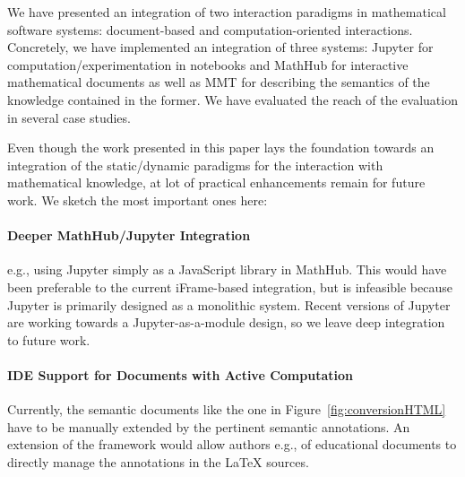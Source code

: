
We have presented an integration of two interaction paradigms in mathematical software systems: document-based and computation-oriented interactions. Concretely, we have implemented an integration of three systems:
Jupyter for computation/experimentation in notebooks and MathHub for interactive mathematical documents as well as MMT for describing the semantics of the knowledge contained in the former.
We have evaluated the reach of the evaluation in several case studies.


Even though the work presented in this paper lays the  foundation towards an integration of the static/dynamic paradigms for the interaction with mathematical knowledge, at lot of practical enhancements remain for future work.
We sketch the most important ones here:

\paragraph{Deeper MathHub/Jupyter Integration} e.g., using Jupyter simply as a JavaScript library in MathHub.
This would have been preferable to the current iFrame-based integration, but is infeasible because Jupyter is primarily designed as a monolithic system.
Recent versions of Jupyter are working towards a Jupyter-as-a-module design, so we leave deep integration to future work.

\paragraph{IDE Support for Documents with Active Computation}
Currently, the semantic documents like the one in Figure~\ref{fig:conversionHTML} have to be manually extended by the pertinent semantic annotations. An extension of the \sTeX framework would allow authors e.g., of educational documents to directly manage the annotations in the {\LaTeX} sources. 

